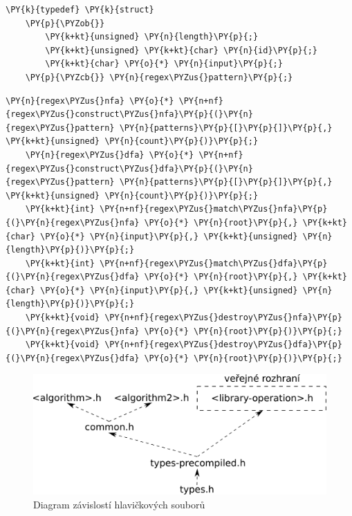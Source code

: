 \begin{Verbatim}[commandchars=\\\{\}]
	\PY{k}{typedef} \PY{k}{struct}
	\PY{p}{\PYZob{}}
		\PY{k+kt}{unsigned} \PY{n}{length}\PY{p}{;}
		\PY{k+kt}{unsigned} \PY{k+kt}{char} \PY{n}{id}\PY{p}{;}
		\PY{k+kt}{char} \PY{o}{*} \PY{n}{input}\PY{p}{;}
	\PY{p}{\PYZcb{}} \PY{n}{regex\PYZus{}pattern}\PY{p}{;}
\end{Verbatim}


\begin{Verbatim}[commandchars=\\\{\}]
	\PY{n}{regex\PYZus{}nfa} \PY{o}{*} \PY{n+nf}{regex\PYZus{}construct\PYZus{}nfa}\PY{p}{(}\PY{n}{regex\PYZus{}pattern} \PY{n}{patterns}\PY{p}{[}\PY{p}{]}\PY{p}{,} \PY{k+kt}{unsigned} \PY{n}{count}\PY{p}{)}\PY{p}{;}
	\PY{n}{regex\PYZus{}dfa} \PY{o}{*} \PY{n+nf}{regex\PYZus{}construct\PYZus{}dfa}\PY{p}{(}\PY{n}{regex\PYZus{}pattern} \PY{n}{patterns}\PY{p}{[}\PY{p}{]}\PY{p}{,} \PY{k+kt}{unsigned} \PY{n}{count}\PY{p}{)}\PY{p}{;}
	\PY{k+kt}{int} \PY{n+nf}{regex\PYZus{}match\PYZus{}nfa}\PY{p}{(}\PY{n}{regex\PYZus{}nfa} \PY{o}{*} \PY{n}{root}\PY{p}{,} \PY{k+kt}{char} \PY{o}{*} \PY{n}{input}\PY{p}{,} \PY{k+kt}{unsigned} \PY{n}{length}\PY{p}{)}\PY{p}{;}
	\PY{k+kt}{int} \PY{n+nf}{regex\PYZus{}match\PYZus{}dfa}\PY{p}{(}\PY{n}{regex\PYZus{}dfa} \PY{o}{*} \PY{n}{root}\PY{p}{,} \PY{k+kt}{char} \PY{o}{*} \PY{n}{input}\PY{p}{,} \PY{k+kt}{unsigned} \PY{n}{length}\PY{p}{)}\PY{p}{;}
	\PY{k+kt}{void} \PY{n+nf}{regex\PYZus{}destroy\PYZus{}nfa}\PY{p}{(}\PY{n}{regex\PYZus{}nfa} \PY{o}{*} \PY{n}{root}\PY{p}{)}\PY{p}{;}
	\PY{k+kt}{void} \PY{n+nf}{regex\PYZus{}destroy\PYZus{}dfa}\PY{p}{(}\PY{n}{regex\PYZus{}dfa} \PY{o}{*} \PY{n}{root}\PY{p}{)}\PY{p}{;}
\end{Verbatim}


\begin{figure}[!htb]
	\centering
	\includegraphics[scale=.25]{fig/header-dependencies.pdf}
	\caption{Diagram závislostí hlavičkových souborů}
	\label{fig:header-dependecies}
\end{figure}

